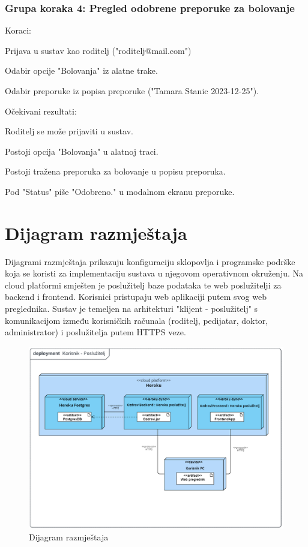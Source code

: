 			 \subsubsection*{Grupa koraka 4: Pregled odobrene preporuke za bolovanje}
			 Koraci:
			 \begin{packed_enum}
				\item Prijava u sustav kao roditelj ("roditelj@mail.com")
				\item Odabir opcije "Bolovanja" iz alatne trake.
				\item Odabir preporuke iz popisa preporuke ("Tamara Stanic 2023-12-25").
			 \end{packed_enum}
			 Očekivani rezultati:
			 \begin{packed_enum}
				\item Roditelj se može prijaviti u sustav.
				\item Postoji opcija "Bolovanja" u alatnoj traci.
				\item Postoji tražena preporuka za bolovanje u popisu preporuka.
				\item Pod "Status" piše "Odobreno." u modalnom ekranu preporuke.
			 \end{packed_enum}
			\eject
		
		\section{Dijagram razmještaja}
			Dijagrami razmještaja prikazuju konfiguraciju sklopovlja i programske podrške koja se koristi za implementaciju sustava u njegovom operativnom okruženju. Na cloud platformi smješten je poslužitelj baze podataka te web poslužitelji za backend i frontend. Korisnici pristupaju web aplikaciji putem svog web preglednika. Sustav je temeljen na arhitekturi "klijent - poslužitelj" s komunikacijom između korisničkih računala (roditelj, pedijatar, doktor, administrator) i poslužitelja putem HTTPS veze.
			\begin{figure}[H]
				\includegraphics[width=\textwidth]{slike/deploymentDiagram.png} 
				\caption{Dijagram razmještaja} 
			\end{figure}
			\eject 
		
